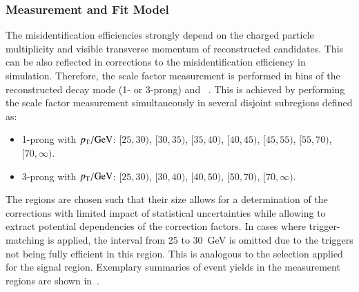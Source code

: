 

\subsubsection{Measurement and Fit Model}

The \jettotauhadvis misidentification efficiencies strongly depend on
the charged particle multiplicity and visible transverse momentum of
reconstructed \tauhadvis candidates. This can be also reflected in
corrections to the \jettotauhadvis misidentification efficiency in
simulation. Therefore, the scale factor measurement is performed in
bins of the reconstructed \tauhadvis decay mode (1- or 3-prong) and
\tauhadvis~\pT. This is achieved by performing the scale factor
measurement simultaneously in several disjoint subregions defined as:
\begin{itemize}

\item 1-prong \tauhadvis with $\pT / \si{\GeV}$: $[25, 30)$, $[30, 35)$,
  $[35, 40)$, $[40, 45)$, $[45, 55)$, $[55, 70)$, $[70, \infty)$.

\item 3-prong \tauhadvis with $\pT / \si{\GeV}$: $[25, 30)$, $[30, 40)$,
  $[40, 50)$, $[50, 70)$, $[70, \infty)$.

\end{itemize}
The regions are chosen such that their size allows for a determination
of the corrections with limited impact of statistical uncertainties
while allowing to extract potential \pT dependencies of the correction
factors. In cases where trigger-matching is applied, the \tauhadvis
\pT interval from 25 to \SI{30}{\GeV} is omitted due to the triggers
not being fully efficient in this region. This is analogous to the
selection applied for the \hadhad signal region. Exemplary summaries
of event yields in the measurement regions are shown
in~.

